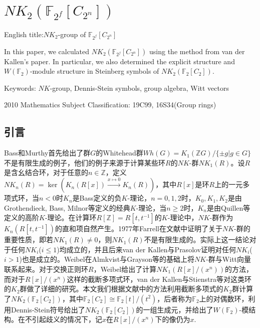 \chapter{$NK_{2}(\mathbb{F}_{2^f}[C_{2^n}])$}
English title:$NK_2$-group of $\mathbb{F}_{2^f}[C_{2^n}]$

 In this paper, we calculated $NK_2(\mathbb{F}_{2^f}[C_{2^n}])$ using the method from van der Kallen's paper. In particular, we also determined the explicit structure and $W(\mathbb{F}_2)$-module structure in Steinberg symbols of $NK_2(\mathbb{F}_{2}[C_{2}])$.

Keywords: $NK$-group, Dennis-Stein symbols, group algebra, Witt vectors

2010 Mathematics Subject Classification: 19C99, 16S34(Group rings)


\section{引言}
Bass和Murthy\cite{MR36:2671}首先给出了群$G$的Whitehead群$Wh(G)=K_1(\mathbb{Z}G)/\{\pm g | g\in G\}$不是有限生成的例子，他们的例子来源于计算某些环$R$的$NK$-群$NK_1(R)$。设$R$是含幺结合环，对于任意的$n\in \mathbb{Z}$，定义$NK_n(R)=\ker(K_n(R[x])\overset{x\mapsto 0}\longrightarrow K_n(R))$，其中$R[x]$是环$R$上的一元多项式环，当$n<0$时$K_{n}$是Bass定义的负$K$-理论，$n=0,1,2$时，$K_0,K_1,K_2$是由Grothendieck, Bass, Milnor等定义的经典$K$-理论，当$n\geq 2$时，$K_n$是由Quillen等定义的高阶$K$-理论。在计算环$R[\mathbb{Z}]=R[t,t^{-1}]$的$K$-理论中，$NK$-群作为$K_n(R[t,t^{-1}])$的直和项自然产生。1977年Farrell在文献\cite{MR56:8624}中证明了关于$NK$-群的重要性质，即若$NK_1(R)\neq 0$，则$NK_1(R)$不是有限生成的。实际上这一结论对于任何$NK_i$($i\leq 1$)均成立的，并且后来van der Kallen\cite{MR81g:18017}与Prasolov\cite{MR83m:18013}证明对任何$NK_i$($i> 1$)也是成立的。Weibel\cite{MR82k:18010}在Almkvist\cite{MR55:5721}与Grayson\cite{MR81e:13014}等的基础上将$NK$-群与Witt向量联系起来。对于交换正则环$R$，Weibel\cite{weibel2013k}给出了计算$NK_1(R[x]/(x^n))$的方法，而对于$R[x]/(x^n)$这样的截断多项式环，van der Kallen\cite{MR45:252}\cite{MR86f:18017}与Stienstra\cite{MR82k:13016}等对这类环的$K_2$群做了详细的研究。本文我们根据文献\cite{MR86f:18017}中的方法利用截断多项式的$K_2$群计算了$NK_2(\mathbb{F}_2[C_{2}])$，其中$\mathbb{F}_2[C_{2}]\cong \mathbb{F}_2[t]/(t^2)$，后者称为$\mathbb{F}_2$上的对偶数环，利用Dennis-Stein符号给出了$NK_2(\mathbb{F}_2[C_{2}])$的一组生成元，并给出了$W(\mathbb{F}_2)$-模结构。在不引起歧义的情况下，记$x$在$R[x]/(x^n)$下的像仍为$x$.


